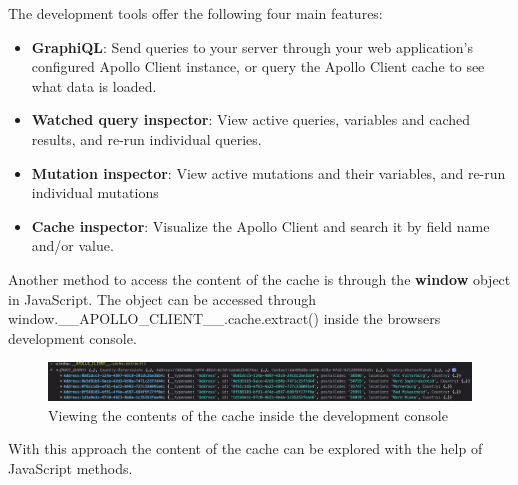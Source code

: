 The development tools offer the following four main features: \cite{misc:-:background:graphql:apollo-developer-tools}

\begin{itemize}
    \item \textbf{GraphiQL}: Send queries to your server through your web application's configured Apollo Client instance, or query the Apollo Client cache to see what data is loaded.
    \item \textbf{Watched query inspector}: View active queries, variables and cached results, and re-run individual queries.
    \item \textbf{Mutation inspector}: View active mutations and their variables, and re-run individual mutations
    \item \textbf{Cache inspector}: Visualize the Apollo Client and search it by field name and/or value.
\end{itemize}

Another method to access the content of the cache is through the \textbf{window} object in JavaScript. The object can be accessed through window.\_\_APOLLO\_CLIENT\_\_.cache.extract() inside the browsers development console.

\ifshowImages
\begin{figure}[H]
    \centering
    \includegraphics[width=1\linewidth]{images/background/apollo/apollo-cache-browser-window.jpeg}
    \caption{Viewing the contents of the cache inside the development console}\label{fig:background:graphql:apollo:apollo-cache-browser-window}
\end{figure}
\fi

With this approach the content of the cache can be explored with the help of JavaScript methods.
